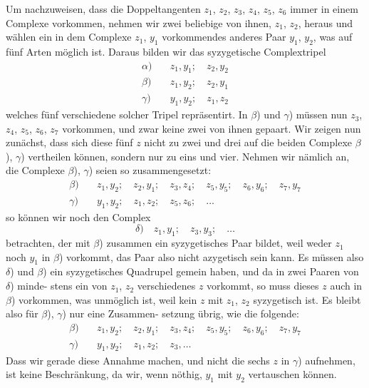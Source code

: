 \documentclass[12pt,a4paper]{article}
\theoremstyle{plain}
\theoremstyle{definition}
\theoremstyle{remark}
\begin{document}
Um nachzuweisen, dass die Doppeltangenten $z_1$, $z_2$, $z_3$, $z_4$, $z_5$, $z_6$
immer in einem Complexe vorkommen, nehmen wir zwei beliebige
von ihnen, $z_1$, $z_2$, heraus und wählen ein in dem Complexe $z_1$, $y_1$
vorkommendes anderes Paar $y_1$, $y_2$, was auf fünf Arten möglich
ist. Daraus bilden wir das syzygetische Complextripel
\begin{equation}\label{eq:98_3}
\begin{aligned}
\alpha) \quad &z_1, y_1; \quad z_2, y_2 \\
\beta) \quad &z_1, y_2; \quad z_2, y_1 \\
\gamma) \quad &y_1, y_2; \quad z_1, z_2
\end{aligned}
\end{equation}
welches fünf verschiedene solcher Tripel repräsentirt. In $\beta$) und
$\gamma$) müssen nun $z_3$, $z_4$, $z_5$, $z_6$, $z_7$ vorkommen, und zwar keine
zwei von ihnen gepaart. Wir zeigen nun zunächst, dass sich
diese fünf $z$ nicht zu zwei und drei auf die beiden Complexe
$\beta$), $\gamma$) vertheilen können, sondern nur zu eins und vier. Nehmen
wir nämlich an, die Complexe $\beta$), $\gamma$) seien so zusammengesetzt:
\begin{equation*}
\begin{aligned}
\beta) \quad &z_1, y_2; \quad z_2, y_1; \quad z_3, z_4; \quad z_5, y_5; \quad z_6, y_6; \quad z_7, y_7 \\
\gamma) \quad &y_1, y_2; \quad z_1, z_2; \quad z_5, z_6; \quad \ldots
\end{aligned}
\end{equation*}
so können wir noch den Complex
\begin{equation*}
\delta) \quad z_1, y_1; \quad z_3, y_3; \quad \ldots
\end{equation*}
betrachten, der mit $\beta$) zusammen ein syzygetisches Paar bildet,
weil weder $z_1$ noch $y_1$ in $\beta$) vorkommt, das Paar also nicht
azygetisch sein kann. Es müssen also $\delta$) und $\beta$) ein syzygetisches
Quadrupel gemein haben, und da in zwei Paaren von $\delta$) minde-
stens ein von $z_1$, $z_2$ verschiedenes $z$ vorkommt, so muss dieses $z$
auch in $\beta$) vorkommen, was unmöglich ist, weil kein $z$ mit $z_1$, $z_2$
syzygetisch ist. Es bleibt also für $\beta$), $\gamma$) nur eine Zusammen-
setzung übrig, wie die folgende:
\begin{equation}\label{eq:98_4}
\begin{aligned}
\beta) \quad &z_1, y_2; \quad z_2, y_1; \quad z_3, z_4; \quad z_5, y_5; \quad z_6, y_6; \quad z_7, y_7 \\
\gamma) \quad &y_1, y_2; \quad z_1, z_2; \quad z_3, \ldots
\end{aligned}
\end{equation}
Dass wir gerade diese Annahme machen, und nicht die
sechs $z$ in $\gamma$) aufnehmen, ist keine Beschränkung, da wir, wenn
nöthig, $y_1$ mit $y_2$ vertauschen können.
\end{document}
